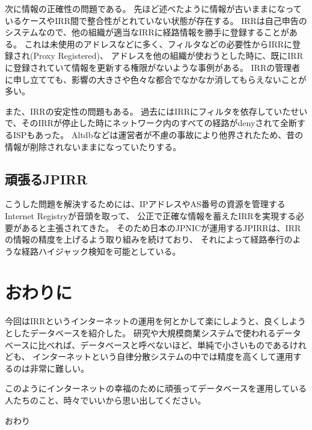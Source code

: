 次に情報の正確性の問題である。
先ほど述べたように情報が古いままになっているケースやIRR間で整合性がとれていない状態が存在する。
IRRは自己申告のシステムなので、他の組織が適当なIRRに経路情報を勝手に登録することがある。
これは未使用のアドレスなどに多く、フィルタなどの必要性からIRRに登録され(Proxy Registered)、
アドレスを他の組織が使おうとした時に、既にIRRに登録されていて情報を更新する権限がないような事例がある。
IRRの管理者に申し立てても、影響の大きさや色々な都合でなかなか消してもらえないことが多い。

また、IRRの安定性の問題もある。
過去にはIRRにフィルタを依存していたせいで、そのIRRが停止した時にネットワーク内のすべての経路がdenyされて全断するISPもあった。
Altdbなどは運営者が不慮の事故により他界されたため、昔の情報が削除されないままになっていたりする。

\subsection{頑張るJPIRR}

こうした問題を解決するためには、IPアドレスやAS番号の資源を管理するInternet Registryが音頭を取って、
公正で正確な情報を蓄えたIRRを実現する必要があると主張されてきた。
そのため日本のJPNICが運用するJPIRRは、IRRの情報の精度を上げるよう取り組みを続けており、
それによって経路奉行のような経路ハイジャック検知を可能としている。

\section{おわりに}

今回はIRRというインターネットの運用を何とかして楽にしようと、良くしようとしたデータベースを紹介した。
研究や大規模商業システムで使われるデータベースに比べれば、データベースと呼べないほど、単純で小さいものであるけれども、
インターネットという自律分散システムの中では精度を高くして運用するのは非常に難しい。

このようにインターネットの幸福のために頑張ってデータベースを運用している人たちのこと、時々でいいから思い出してください。

\begin{flushright}
おわり
\end{flushright}
